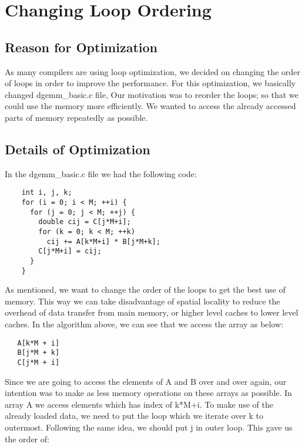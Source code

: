 
\section{Changing Loop Ordering}
\label{sec-opts-loop}

\subsection{Reason for Optimization}

As many compilers are using loop optimization, we decided on changing the
order of loops in order to improve the performance. For this
optimization, we basically changed dgemm\_basic.c file, Our motivation was
to reorder the loops; so that we could use the memory more
efficiently. We wanted to access the already accessed parts of memory
repeatedly as possible.

\subsection{Details of Optimization}

In the dgemm\_basic.c file we had the following code:
\smallskip

\begin{verbatim}
    int i, j, k;
    for (i = 0; i < M; ++i) {
      for (j = 0; j < M; ++j) {
        double cij = C[j*M+i];
        for (k = 0; k < M; ++k)
          cij += A[k*M+i] * B[j*M+k];
        C[j*M+i] = cij;
      }
    }
\end{verbatim}
\smallskip

As mentioned, we want to change the order of the loops to get the best
use of memory. This way we can take disadvantage of spatial locality to
reduce the overhead of data transfer from main memory, or higher level
caches to lower level caches.  In the algorithm above, we can see that we
access the array as below:
\smallskip

\begin{verbatim}
   A[k*M + i]
   B[j*M + k]
   C[j*M + i]
\end{verbatim}

Since we are going to access the elements of A and B over and over again,
our intention was to make as less memory operations on these arrays as
possible. In array A we access elements which has index of k*M+i. To make
use of the already loaded data, we need to put the loop which we iterate
over k to outermost. Following the same idea, we should put j in outer
loop. This gave us the order of:
\smallskip

